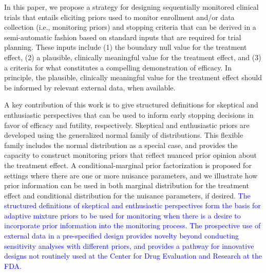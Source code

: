 \documentclass[AMA,STIX1COL,doublespace]{WileyNJD-v2}
\begin{document}
In this paper, we propose a strategy for designing sequentially monitored clinical trials that entails eliciting 
priors used to monitor enrollment and/or data collection (i.e., monitoring priors) and stopping criteria that can 
be derived in a semi-automatic fashion based on standard inputs that are required for trial planning. 
%
These inputs include (1) the boundary null value for the treatment effect, (2) a plausible, clinically meaningful 
value for the treatment effect, and (3) a criteria for what constitutes a compelling demonstration of efficacy. 
%
In principle, the plausible, clinically meaningful value for the treatment effect should be informed by relevant external data, when available. 


A key contribution of this work is to give structured definitions for skeptical and enthusiastic perspectives that can be used 
to inform early stopping decisions in favor of efficacy and futility, respectively. Skeptical and enthusiastic priors are developed using the generalized normal family of distributions. 
This flexible family includes the normal distribution as a special case, and provides the capacity to construct monitoring 
priors that reflect nuanced prior opinion about the treatment effect. 
A conditional-marginal prior factorization is proposed for settings where there are one or more nuisance 
parameters, and we illustrate how prior information can be used in both marginal 
distribution for the treatment effect and conditional distribution for the nuisance parameters, if desired. 
%
\textcolor{blue}{The structured definitions of skeptical and enthusiastic perspectives form the basis for adaptive mixture priors to be used for monitoring when there is a desire to incorporate prior information into the monitoring process. The prospective use of external data in a pre-specified design provides novelty beyond conducting sensitivity analyses with different priors, and provides a pathway for innovative designs not routinely used at the Center for Drug Evaluation and Research at the FDA.}
\end{document}
